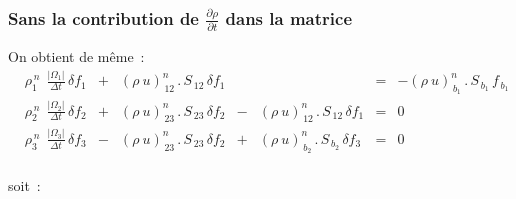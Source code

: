 \subsubsection*{Sans la contribution de
$\displaystyle\frac{\partial \rho}{\partial t}$ dans la matrice}


On obtient de même~:
\begin{equation}
\begin{array}{lllllllll}
&\displaystyle \rho_1^{\,n}\ \displaystyle\ \frac{|\Omega_1|}{\Delta t}\,\delta f_1&+& (\rho\ u)^n_{\,12}\,.\,S_{\,12}\,\delta f_1& &\ \ \ \ \  &= &-(\rho\ u)^n_{\,b_1}\,.\,S_{\,b_1}\,f_{\,b_1}\\
&\displaystyle\rho_2^{\,n}\ \displaystyle\ \frac{|\Omega_2|}{\Delta
t}\,\delta f_2 &+&(\rho\ u)^n_{\,23}\,.\,S_{\,23}\,\delta f_2  &-&(\rho\
u)^n_{\,12}\,.\,S_{\,12}\,\delta f_1 &= &0\\
&\displaystyle\rho_3^{\,n}\ \displaystyle\ \frac{|\Omega_3|}{\Delta t}\,\delta
f_3 &-&(\rho\ u)^n_{\,23}\,.\,S_{\,23}\,\delta f_2     &+&(\rho\
u)^n_{\,b_2}\,.\,S_{\,b_2}\,\delta f_3 &= &0\\
\end{array}
\end{equation}

soit~:

